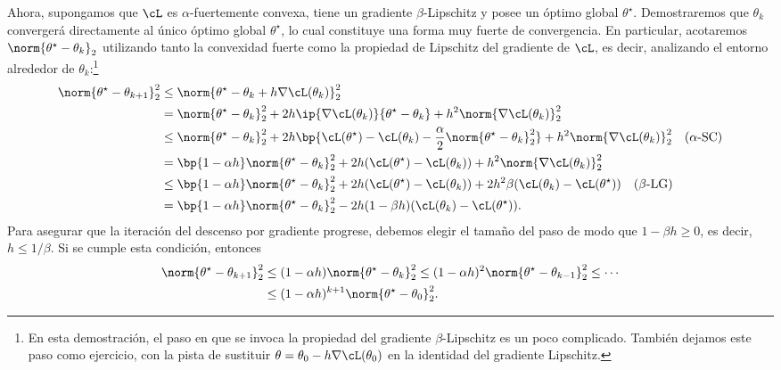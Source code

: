 \documentclass[../../book-main_es.tex]{subfiles}
\begin{document}
Ahora, supongamos que \(\cL\) es \(\alpha\)-fuertemente convexa, tiene
un gradiente \(\beta\)-Lipschitz y posee un óptimo global
\(\theta^{\star}\). Demostraremos que \(\theta_{k}\) convergerá
directamente al único óptimo global \(\theta^{\star}\), lo cual constituye una
forma muy fuerte de convergencia. En particular, acotaremos
\(\norm{\theta^{\star} - \theta_{k}}_{2}\) utilizando tanto la
convexidad fuerte como la propiedad de Lipschitz del gradiente de \(\cL\), es decir,
analizando el entorno alrededor de \(\theta_{k}\):\footnote{En esta
    demostración, el paso en que se invoca la propiedad del gradiente \(\beta\)-Lipschitz es un poco
    complicado. También dejamos este paso como ejercicio, con la pista de
    sustituir \(\theta = \theta_{0} - h\nabla \cL(\theta_{0})\) en la
    identidad del gradiente Lipschitz.}
\begin{align}
    \norm{\theta^{\star} - \theta_{k + 1}}_{2}^{2}
    &\leq \norm{\theta^{\star} - \theta_{k} + h\nabla
    \cL(\theta_{k})}_{2}^{2} \\
    &= \norm{\theta^{\star} - \theta_{k}}_{2}^{2} + 2h\ip{\nabla
    \cL(\theta_{k})}{\theta^{\star} - \theta_{k}} + h^{2}\norm{\nabla
    \cL(\theta_{k})}_{2}^{2} \\
    &\leq \norm{\theta^{\star} - \theta_{k}}_{2}^{2} +
    2h\bp{\cL(\theta^{\star}) - \cL(\theta_{k}) -
    \frac{\alpha}{2}\norm{\theta^{\star} - \theta_{k}}_{2}^{2}} +
    h^{2}\norm{\nabla \cL(\theta_{k})}_{2}^{2} \quad \text{(\(\alpha\)-SC)} \\
    &= \bp{1 - \alpha h}\norm{\theta^{\star} - \theta_{k}}_{2}^{2} +
    2h(\cL(\theta^{\star}) - \cL(\theta_{k})) + h^{2}\norm{\nabla
    \cL(\theta_{k})}_{2}^{2} \\
    &\leq \bp{1 - \alpha h}\norm{\theta^{\star} - \theta_{k}}_{2}^{2}
    + 2h(\cL(\theta^{\star}) - \cL(\theta_{k})) +
    2h^{2}\beta(\cL(\theta_{k}) - \cL(\theta^{\star})) \quad
    \text{(\(\beta\)-LG)} \\
    &= \bp{1 - \alpha h}\norm{\theta^{\star} - \theta_{k}}_{2}^{2} -
    2h(1 - \beta h)(\cL(\theta_{k}) - \cL(\theta^{\star})).
\end{align}
Para asegurar que la iteración del descenso por gradiente progrese,
debemos elegir el tamaño del paso de modo que \(1 - \beta h \geq 0\), es decir, \(h
\leq 1/\beta\). Si se cumple esta condición, entonces
\begin{align}
    \norm{\theta^{\star} - \theta_{k + 1}}_{2}^{2}
    &\leq (1 - \alpha h)\norm{\theta^{\star} - \theta_{k}}_{2}^{2}
    \leq (1 - \alpha h)^{2}\norm{\theta^{\star} - \theta_{k -
    1}}_{2}^{2} \leq \cdots \\
    &\leq (1 - \alpha h)^{k + 1}\norm{\theta^{\star} - \theta_{0}}_{2}^{2}.
\end{align}
\end{document}

